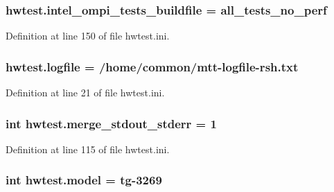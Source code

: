 \hypertarget{namespacehwtest_a6047a9d712208748ac55f9c3e2bcc0ce}{
\subsubsection[{intel\-\_\-ompi\-\_\-tests\-\_\-buildfile}]{\setlength{\rightskip}{0pt plus 5cm}hwtest.\-intel\-\_\-ompi\-\_\-tests\-\_\-buildfile = all\-\_\-tests\-\_\-no\-\_\-perf}}\label{namespacehwtest_a6047a9d712208748ac55f9c3e2bcc0ce}


Definition at line 150 of file hwtest.\-ini.

\hypertarget{namespacehwtest_a741c9ed9ca6a98101b7fb9d19d68c869}{
\subsubsection[{logfile}]{\setlength{\rightskip}{0pt plus 5cm}hwtest.\-logfile = /home/common/mtt-\/logfile-\/rsh.\-txt}}\label{namespacehwtest_a741c9ed9ca6a98101b7fb9d19d68c869}


Definition at line 21 of file hwtest.\-ini.

\hypertarget{namespacehwtest_a48f78a49ff7c6103a9c7c8565ec98438}{
\subsubsection[{merge\-\_\-stdout\-\_\-stderr}]{\setlength{\rightskip}{0pt plus 5cm}int hwtest.\-merge\-\_\-stdout\-\_\-stderr = 1}}\label{namespacehwtest_a48f78a49ff7c6103a9c7c8565ec98438}


Definition at line 115 of file hwtest.\-ini.

\hypertarget{namespacehwtest_ae54fc3a5be1cdc41fa34eb22483e6909}{
\subsubsection[{model}]{\setlength{\rightskip}{0pt plus 5cm}int hwtest.\-model = tg-\/3269}}\label{namespacehwtest_ae54fc3a5be1cdc41fa34eb22483e6909}


